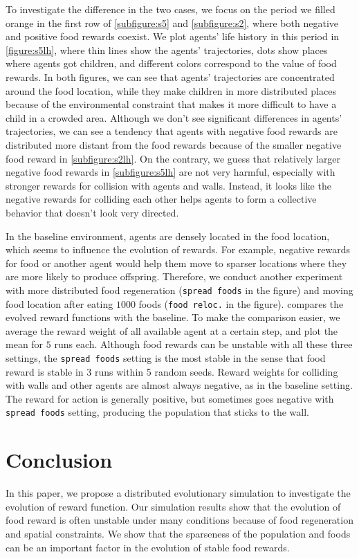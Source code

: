 To investigate the difference in the two cases, we focus on the period we filled orange in the first row of \cref{subfigure:s5} and \cref{subfigure:s2}, where both negative and positive food rewards coexist. We plot agents' life history in this period in \cref{figure:s5lh}, where thin lines show the agents' trajectories, dots show places where agents got children, and different colors correspond to the value of food rewards. In both figures, we can see that agents' trajectories are concentrated around the food location, while they make children in more distributed places because of the environmental constraint that makes it more difficult to have a child in a crowded area.
Although we don't see significant differences in agents' trajectories, we can see a tendency that agents with negative food rewards are distributed more distant from the food rewards because of the smaller negative food reward in \cref{subfigure:s2lh}. On the contrary, we guess that relatively larger negative food rewards in \cref{subfigure:s5lh} are not very harmful, especially with stronger rewards for collision with agents and walls. Instead, it looks like the negative rewards for colliding each other helps agents to form a collective behavior that doesn't look very directed.


In the baseline environment, agents are densely located in the food location, which seems to influence the evolution of rewards. For example, negative rewards for food or another agent would help them move to sparser locations where they are more likely to produce offspring. Therefore, we conduct another experiment with more distributed food regeneration (\texttt{spread foods} in the figure) and moving food location after eating $1000$ foods (\texttt{food reloc.} in the figure).  compares the evolved reward functions with the baseline. To make the comparison easier, we average the reward weight of all available agent at a certain step, and plot the mean for $5$ runs each. Although food rewards can be unstable with all these three settings, the \texttt{spread foods} setting is the most stable in the sense that food reward is stable in 3 runs within 5 random seeds. Reward weights for colliding with walls and other agents are almost always negative, as in the baseline setting. The reward for action is generally positive, but sometimes goes negative with \texttt{spread foods} setting, producing the population that sticks to the wall.

\section{Conclusion}
In this paper, we propose a distributed evolutionary simulation to investigate the evolution of reward function. Our simulation results show that the evolution of food reward is often unstable under many conditions because of food regeneration and spatial constraints. We show that the sparseness of the population and foods can be an important factor in the evolution of stable food rewards.